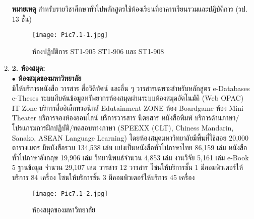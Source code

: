 \begin{enumerate}[label={},leftmargin=0cm]
\noindent
{\bf หมายเหตุ}	สำหรับรายวิชาศึกษาทั่วไปหลักสูตรใช้ห้องเรียนที่อาคารเรียนรวมและปฏิบัติการ (รป. 13 ชั้น)

\begin{figure}
\begin{center}
\texttt{[image: Pic7.1-1.jpg]}\\
\caption{ห้องปฏิบัติการ ST1-905 ST1-906 และ ST1-908}
\end{center}
\end{figure}
\newpage
\item {\bf 2. ห้องสมุด:}\\ {\bf $\bullet$ ห้องสมุดของมหาวิทยาลัย}\\
\hspace*{1cm} มีให้บริการหนังสือ วารสาร สื่อวิดีทัศน์ และอื่น ๆ วารสารเฉพาะสำหรับหลักสูตร e-Databases e-Theses ระบบสืบค้นข้อมูลทรัพยากรห้องสมุดผ่านระบบห้องสมุดอัตโนมัติ (Web OPAC) IT-Zone บริการสื่ออิเล็กทรอนิกส์ Edutainment ZONE ห้อง Boardgame ห้อง Mini Theater บริการจองห้องออนไลน์ บริการวารสาร นิตยสาร หนังสือพิมพ์ บริการด้านภาษา/โปรแกรมการฝึกปฏิบัติ/ทดสอบทางภาษา (SPEEXX (CLT), Chiness Mandarin, Sanako, ASEAN Language Learning) โดยห้องสมุดมหาวิทยาลัยมีพื้นที่ใช้สอย 20,000 ตารางเมตร มีหนังสือรวม 134,538 เล่ม แบ่งเป็นหนังสือทั่วไปภาษาไทย 86,159 เล่ม หนังสือทั่วไปภาษาอังกฤษ 19,906 เล่ม วิทยานิพนธ์จำนวน 4,853 เล่ม งานวิจัย 5,161 เล่ม  e-Book 5 ฐานข้อมูล จำนวน 29,107 เล่ม วารสาร 12 วารสาร โซนให้บริการชั้น 1 มีคอมพิวเตอร์ให้บริการ 84 เครื่อง  โซนให้บริการชั้น 3 มีคอมพิวเตอร์ให้บริการ 45 เครื่อง 
\begin{figure}[h!]
	\begin{center}
		\texttt{[image: Pic7.1-2.jpg]}\\[0.2cm]
		\caption{ห้องสมุดของมหาวิทยาลัย}
	\end{center}
\end{figure}


\end{enumerate}
